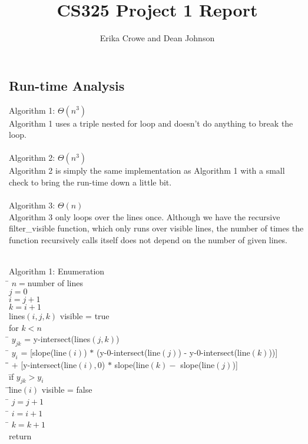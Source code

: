 \documentclass{article}
\title{CS325 Project 1 Report}
\author{Erika Crowe and Dean Johnson}
\begin{document}
\maketitle


\subsection*{Run-time Analysis}
Algorithm 1: $\Theta(n^3)$ \\
Algorithm 1 uses a triple nested for loop and doesn't do anything to break the loop. \\
\\
Algorithm 2: $\Theta(n^3)$ \\
Algorithm 2 is simply the same implementation as Algorithm 1 with a small check 
to bring the run-time down a little bit. \\
\\
Algorithm 3: $\Theta(n)$ \\
Algorithm 3 only loops over the lines once. Although we have the recursive 
filter_visible function, which only runs over visible lines, the number of 
times the function recursively calls itself does not depend on the number of 
given lines. \\
\\

\begin{tabbing}
  {\sc Algorithm 1: Enumeration}\\
  \qquad \= $n = $number of lines \\
  \> $j = 0$ \\
  \> $i = j+1$\\
  \> $k = i+1$\\
  \> lines$(i,j,k)$ visible = true\\
  \> for $k < n$\\
  \> \qquad \= $y_{jk}$ = y-intersect(lines$(j,k)$)\\
  \> \qquad \= $y_{i}$ = [slope(line$(i)$) $*$ (y-0-intersect(line$(j)$) - y-0-intersect(line$(k)$))]\\
  \> \qquad \= \qquad \= $+$  [y-intersect(line$(i),0$) $*$ slope(line$(k) -$ slope(line$(j)$)]\\ 
  \> \qquad \= if $y_{jk} > y_{i}$\\
  \> \qquad \= \qquad \= line$(i)$ visible = false\\
  \> \qquad \= $j = j+1$\\
  \> \qquad \= $i = i+1$\\
  \> \qquad \= $k = k+1$\\
  \> return
\end{tabbing}
\end{document}
